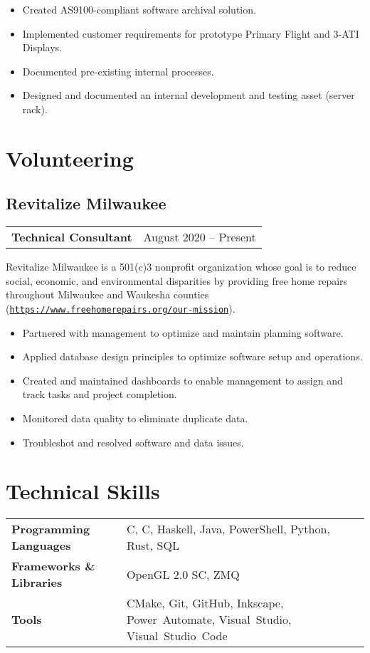 \documentclass[10pt]{article}
\newcommand{\Rplus}{\protect\raisebox{0.35ex}{\smaller{\smaller{\textbf{+}}}}}
\newcommand{\Rsharp}{\protect\raisebox{0.35ex}{\smaller{\smaller{\textbf{\#}}}}}
\newcommand{\Cpp}{\mbox{C\Rplus\Rplus}}
\newcommand{\Csharp}{\mbox{C\Rsharp}}
\newcommand{\firstpar}{\vspace{4pt}\noindent}
\begin{document}
\begin{itemize}[noitemsep, leftmargin=*]
    \item Created AS9100-compliant software archival solution.
    \item Implemented customer requirements for prototype Primary Flight and 3-ATI Displays.
    \item Documented pre-existing internal processes.
    \item Designed and documented an internal development and testing asset (server rack).
\end{itemize}

\section*{Volunteering}
\subsection*{Revitalize Milwaukee}
\begin{tabular}{@{}ll@{}}
    \textbf{Technical Consultant} & August 2020 -- Present
\end{tabular}

\firstpar
Revitalize Milwaukee is a 501(c)3 nonprofit organization whose goal is to reduce social, economic,
and environmental disparities by providing free home repairs throughout Milwaukee and Waukesha counties
(\href{https://www.freehomerepairs.org/our-mission}{\texttt{https://www.freehomerepairs.org/our-mission}}).

\begin{itemize}[noitemsep, leftmargin=*]
    \item Partnered with management to optimize and maintain planning software.
    \item Applied database design principles to optimize software setup and operations.
    \item Created and maintained dashboards to enable management to assign and track tasks and project completion.
    \item Monitored data quality to eliminate duplicate data.
    \item Troubleshot and resolved software and data issues.
\end{itemize}

\section*{Technical Skills}
\begin{tabularx}{\textwidth}{@{}>{\bfseries}l>{\raggedright\arraybackslash}X@{}}
    Programming Languages   &
    \Cpp, \Csharp, Haskell, Java, PowerShell, Python, Rust, SQL \\
    Frameworks \& Libraries &
    OpenGL 2.0 SC, ZMQ                                          \\
    Tools                   &
    CMake, Git, GitHub, Inkscape, \mbox{Power Automate}, \mbox{Visual Studio}, \mbox{Visual Studio Code}
\end{tabularx}
\end{document}
